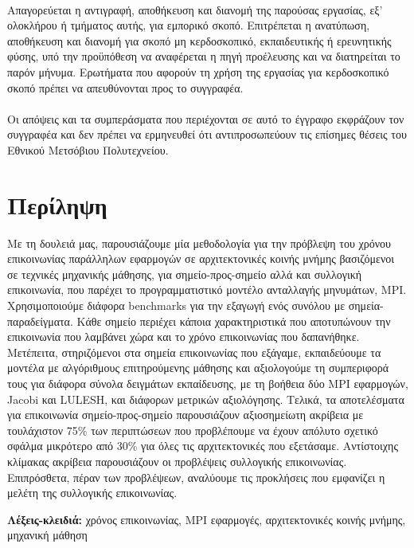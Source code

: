 \documentclass[a4paper,twoside,titlepage,11pt]{book}
\begin{document}
\paragraph{}
Απαγορεύεται η αντιγραφή, αποθήκευση και διανομή της παρούσας εργασίας, εξ' ολοκλήρου ή τμήματος αυτής, για εμπορικό σκοπό. Επιτρέπεται η  ανατύπωση, αποθήκευση και διανομή για σκοπό μη κερδοσκοπικό, εκπαιδευτικής ή ερευνητικής φύσης, υπό την προϋπόθεση να αναφέρεται η πηγή προέλευσης και να διατηρείται το παρόν μήνυμα. Ερωτήματα που αφορούν τη χρήση της εργασίας για κερδοσκοπικό σκοπό πρέπει να απευθύνονται προς το συγγραφέα.
\paragraph{}
Οι απόψεις και τα συμπεράσματα που περιέχονται σε αυτό το έγγραφο εκφράζουν τον συγγραφέα και δεν πρέπει να ερμηνευθεί ότι αντιπροσωπεύουν τις επίσημες θέσεις του Εθνικού Μετσόβιου Πολυτεχνείου.  
\newpage


\section*{\centering Περίληψη}
Με τη δουλειά μας, παρουσιάζουμε μία μεθοδολογία για την πρόβλεψη του χρόνου επικοινωνίας παράλληλων εφαρμογών σε αρχιτεκτονικές κοινής μνήμης βασιζόμενοι σε τεχνικές μηχανικής μάθησης, για σημείο-προς-σημείο αλλά και συλλογική επικοινωνία, που παρέχει το προγραμματιστικό μοντέλο ανταλλαγής μηνυμάτων, MPI.  Χρησιμοποιούμε διάφορα benchmarks για την εξαγωγή ενός συνόλου με σημεία-παραδείγματα. Κάθε σημείο περιέχει κάποια χαρακτηριστικά που αποτυπώνουν την επικοινωνία που λαμβάνει χώρα και το χρόνο επικοινωνίας που δαπανήθηκε. Μετέπειτα, στηριζόμενοι στα σημεία επικοινωνίας που εξάγαμε, εκπαιδεύουμε τα μοντέλα με αλγόριθμους επιτηρούμενης μάθησης και αξιολογούμε τη συμπεριφορά τους για διάφορα σύνολα δειγμάτων εκπαίδευσης, με τη βοήθεια δύο MPI εφαρμογών, Jacobi και LULESH, και διάφορων μετρικών αξιολόγησης. Τελικά, τα αποτελέσματα για επικοινωνία σημείο-προς-σημείο παρουσιάζουν αξιοσημείωτη ακρίβεια με τουλάχιστον 75\%  των περιπτώσεων που προβλέπουμε να έχουν απόλυτο σχετικό σφάλμα μικρότερο από 30\% για όλες τις αρχιτεκτονικές που εξετάσαμε. Αντίστοιχης κλίμακας ακρίβεια παρουσιάζουν οι προβλέψεις συλλογικής επικοινωνίας. Επιπρόσθετα,  πέραν των προβλέψεων, αναλύουμε τις προκλήσεις που εμφανίζει η μελέτη της συλλογικής επικοινωνίας.

\vspace*{\fill}
\textbf{Λέξεις-κλειδιά:} χρόνος επικοινωνίας, MPI εφαρμογές, αρχιτεκτονικές κοινής μνήμης, μηχανική μάθηση
\newpage
\end{document}
